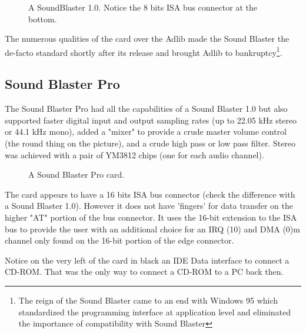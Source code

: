 \documentclass[book.tex]{subfiles}
\begin{document}
\begin{figure}[H] 
  \centering 
  \caption{A SoundBlaster 1.0. Notice the 8 bits ISA bus connector at the bottom.}
\end{figure}
\par
   The numerous qualities of the card over the Adlib made the Sound Blaster the de-facto standard shortly after its release and brought Adlib to bankruptcy\footnote{The reign of the Sound Blaster came to an end with Windows 95 which standardized the programming interface at application level and eliminated the importance of compatibility with Sound Blaster}.


  \subsection{Sound Blaster Pro}
The Sound Blaster Pro had all the capabilities of a Sound Blaster 1.0 but also supported faster digital input and output sampling rates (up to 22.05 kHz stereo or 44.1 kHz mono), added a "mixer" to provide a crude master volume control (the round thing on the picture), and a crude high pass or low pass filter. Stereo was achieved with a pair of YM3812 chips (one for each audio channel).\\
\begin{figure}[H] 
  \centering 
  \caption{A Sound Blaster Pro card.}
\end{figure}
 The card appears to have a 16 bits ISA bus connector (check the difference with a Sound Blaster 1.0). However it does not have 'fingers' for data transfer on the higher "AT" portion of the bus connector. It uses the 16-bit extension to the ISA bus to provide the user with an additional choice for an IRQ (10) and DMA (0)m channel only found on the 16-bit portion of the edge connector.\\
\par
{} Notice on the very left of the card in black an IDE Data interface to connect a CD-ROM. That was the only way to connect a CD-ROM to a PC back then.
\end{document}
